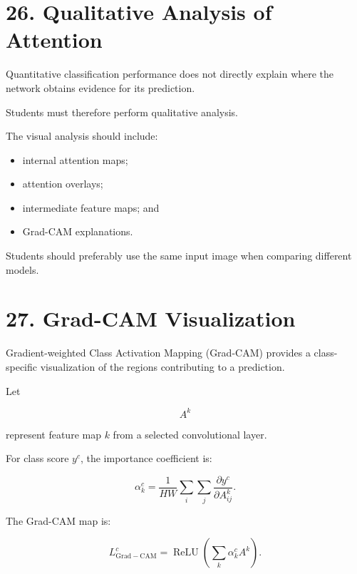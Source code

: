 \documentclass[10pt]{article}
\begin{document}
\section*{26. Qualitative Analysis of Attention}

Quantitative classification performance does not directly explain where the
network obtains evidence for its prediction.

Students must therefore perform qualitative analysis.

The visual analysis should include:

\begin{itemize}

\item internal attention maps;

\item attention overlays;

\item intermediate feature maps; and

\item Grad-CAM explanations.

\end{itemize}

Students should preferably use the same input image when comparing different
models.

\section*{27. Grad-CAM Visualization}

Gradient-weighted Class Activation Mapping (Grad-CAM) provides a
class-specific visualization of the regions contributing to a prediction.

Let

\[
A^k
\]

represent feature map $k$ from a selected convolutional layer.

For class score $y^c$, the importance coefficient is:

\[
\alpha_k^c
=
\frac{1}{HW}
\sum_i
\sum_j
\frac{\partial y^c}
{\partial A_{ij}^k}.
\]

The Grad-CAM map is:

\[
L_{\mathrm{Grad-CAM}}^c
=
\operatorname{ReLU}
\left(
\sum_k
\alpha_k^c A^k
\right).
\]
\end{document}
